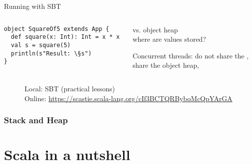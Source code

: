 \documentclass[aspectratio=169]{beamer}
\begin{document}
\begin{frame}[fragile]{Running with SBT}
~\\[-8mm]
\begin{columns}
\begin{column}{0.48\textwidth}
\begin{lstlisting}
object SquareOf5 extends App {
  def square(x: Int): Int = x * x
  val s = square(5)
  println(s"Result: \§s")
}
\end{lstlisting}
\end{column}
\begin{column}{0.48\textwidth}
 vs. \alert{object heap}
\\[2mm]
where are values stored?
\\[5mm]
\begin{block}{Concurrent threads:}
do not share the ,
\\share the \alert{object heap},  
\end{block}
\end{column}
\end{columns}

\pause
\bigskip
~~~~~~\alert{Local:} SBT (practical lessons)\\
~~~~~~\alert{Online:} \url{https://scastie.scala-lang.org/cIf3BCTQRBybqMcQpYArGA}
\end{frame}


\begin{frame}\frametitle{Stack and Heap}
    \centering
    

\end{frame}

\section{Scala in a nutshell}
\end{document}
